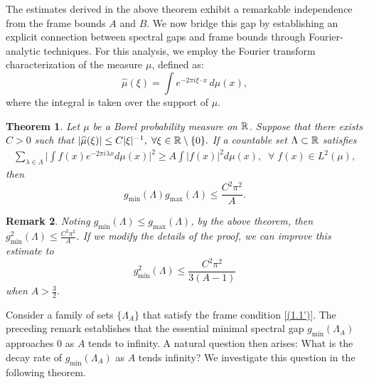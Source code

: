 \documentclass[12pt,psfig,reqno]{amsart}
\numberwithin{equation}{section}
\theoremstyle{plain}
\newtheorem{thm}{Theorem}[section]
\newtheorem{re}[thm]{Remark}
\begin{document}
The estimates derived in the above theorem exhibit a remarkable independence from the frame bounds $A$ and $B$. We now bridge this gap by establishing an explicit connection between spectral gaps and frame bounds through Fourier-analytic techniques. For this analysis, we employ the Fourier transform characterization of the measure $\mu$, defined as:
\[
\widehat{\mu}(\xi) = \int e^{-2\pi i \xi \cdot x} \, d\mu(x),
\]
where the integral is taken over the support of $\mu$. 
\begin{thm}\label{thm1.1}
	Let $\mu$ be a Borel probability measure on $\Bbb R$. 
	Suppose that there exists $C>0$ such that \( |\widehat{\mu}(\xi)|\leq C|\xi|^{-1},\;\forall\xi\in\Bbb R\setminus\{0\}. \) 
If a countable set \(\Lambda\subset\Bbb R\) satisfies 
\begin{align}\label{(1.1')}
	\sum_{\lambda\in\Lambda}\Big|\int f(x)e^{-2\pi i\lambda x}d\mu(x)\Big|^2\geq A
	\int |f(x)|^2d\mu(x),\;\;\forall\;f(x)\in L^2(\mu),
\end{align}
then 
	\[
	g_{\min}(\Lambda) g_{\max}(\Lambda)\leq \frac{C^2\pi^2}{A}.
	\] 
\end{thm}
\begin{re}\label{thm1.2}
	Noting $g_{\min}(\Lambda)\leq g_{\max}(\Lambda)$, by the above theorem, then $	g_{\min}^2(\Lambda)\leq\frac{C^2\pi^2}{A}$. 
	If we modify the details of the proof, we can improve this estimate to $$	g_{\min}^2(\Lambda)\leq	\frac{C^2\pi^2}{3(A-1)}$$ when \( A>\frac32\).
\end{re}

Consider a family of sets 
 \(\{\Lambda_A\}\) that satisfy the frame condition \eqref{(1.1')}. 
The preceding remark establishes that the essential minimal spectral gap  \(g_{\min}(\Lambda_A)\) approaches $0$ as 
$A$ tends to infinity.
 A natural question then arises: What is the decay rate of \(g_{\min}(\Lambda_A)\) as \(A\) tends infinity? We investigate this question in the following theorem.
\end{document}
